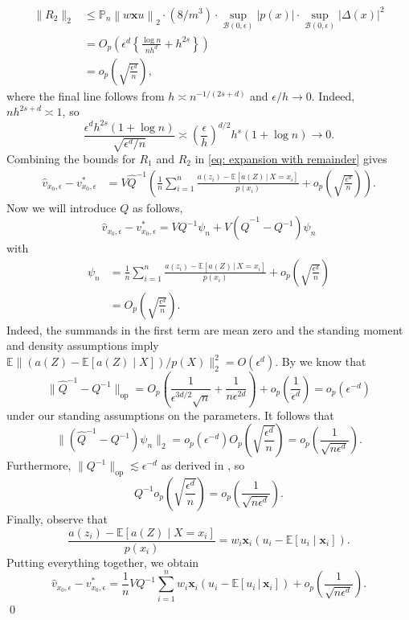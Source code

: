 \documentclass[11pt]{article}
\begin{document}
\begin{appendices}
\begin{align*}
    \|R_2\|_2 &\leq \mathbb{P}_n\left\|w\boldsymbol{x}u\right\|_2\cdot (8/m^3)\cdot \sup_{\mathcal{B}(0, \epsilon)}|p(x)|\cdot \sup_{\mathcal{B}(0, \epsilon)}|\Delta(x)|^2 \\
    &= O_p\left(\epsilon^d\left\{\frac{\log n}{nh^d} +h^{2s}\right\}\right) \\
    &= o_p\left(\sqrt{\frac{\epsilon^d}{n}}\right),
\end{align*}
where the final line follows from $h\asymp n^{-1/(2s+d)}$ and $\epsilon/h\rightarrow0$. Indeed, $nh^{2s+d}\asymp1$, so
\[
    \frac{\epsilon^d h^{2s}(1+\log n)}{\sqrt{\epsilon^d/n}}
    \asymp
    \left(\frac{\epsilon}{h}\right)^{d/2}h^s(1+\log n)
    \rightarrow0.
\] Combining the bounds for $R_1$ and $R_2$ in \cref{eq: expansion with remainder} gives
\begin{align*}
    \hat{v}_{x_0, \epsilon} - v^*_{x_0, \epsilon}
    &= V\hat{Q}^{-1}\left(\frac{1}{n}\sum_{i = 1}^n\frac{a(z_i) - \mathbb{E}[a(Z)\,|\,X=x_i]}{p(x_i)}
    + o_p\left(\sqrt{\frac{\epsilon^d}{n}}\right)\right).
\end{align*}
Now we will introduce $Q$ as follows,
\begin{equation*}
    \hat{v}_{x_0, \epsilon} - v^*_{x_0, \epsilon} = VQ^{-1}\psi_n + V(\hat{Q}^{-1} - Q^{-1})\psi_n
\end{equation*}
with
\begin{align*}
    \psi_n &= \frac{1}{n}\sum_{i = 1}^n\frac{a(z_i) -\mathbb{E}[a(Z)\,|\,X=x_i]}{p(x_i)}
    + o_p\left(\sqrt{\frac{\epsilon^d}{n}}\right) \\
    &= O_p\left(\sqrt{\frac{\epsilon^d}{n}}\right).
\end{align*}
Indeed, the summands in the first term are mean zero and the standing moment and density assumptions imply
$\mathbb{E}\|(a(Z)-\mathbb{E}[a(Z)\mid X])/p(X)\|_2^2=O(\epsilon^d)$. By  we know that
\[
    \|\hat{Q}^{-1} - Q^{-1}\|_{\operatorname{op}}
    =
    O_p\left(\frac{1}{\epsilon^{3d/2}\sqrt{n}} + \frac{1}{n\epsilon^{2d}}\right) + o_p\left(\frac{1}{\epsilon^d}\right)
    =
    o_p(\epsilon^{-d})
\]
under our standing assumptions on the parameters. It follows that
\[
    \|(\hat Q^{-1}-Q^{-1})\psi_n\|_2
    =
    o_p(\epsilon^{-d})O_p\left(\sqrt{\frac{\epsilon^d}{n}}\right)
    =
    o_p\left(\frac{1}{\sqrt{n\epsilon^d}}\right).
\]
Furthermore, $\|Q^{-1}\|_{\operatorname{op}} \lesssim \epsilon^{-d}$ as derived in , so
\[
    Q^{-1}o_p\left(\sqrt{\frac{\epsilon^d}{n}}\right)
    =
    o_p\left(\frac{1}{\sqrt{n\epsilon^d}}\right).
\]
Finally, observe that
\[
    \frac{a(z_i)-\mathbb{E}[a(Z)\mid X=x_i]}{p(x_i)}
    =
    w_i\boldsymbol{x}_i\left(u_i-\mathbb{E}[u_i\mid \boldsymbol{x}_i]\right).
\]
Putting everything together, we obtain
\begin{equation}
    \hat{v}_{x_0, \epsilon} - v^*_{x_0, \epsilon}
    =
    \frac{1}{n}VQ^{-1}\sum_{i = 1}^nw_i\boldsymbol{x}_i(u_i - \mathbb{E}[u_i\,|\,\boldsymbol{x}_i])
    + o_p\left(\frac{1}{\sqrt{n\epsilon^{d}}}\right).
\end{equation}
\qed{}




\end{appendices}
\end{document}
